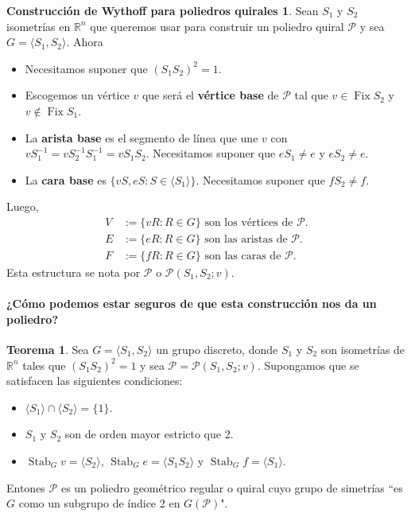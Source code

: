 \documentclass[spanish]{article}
\theoremstyle{definition}
\newtheorem*{teo}{Teorema}
\newtheorem*{Wqui}{Construcción de Wythoff para poliedros quirales}
\newcommand{\R}{\mathbb{R}}
\newcommand{\p}{\mathcal{P}}
\DeclareMathOperator{\Fix}{Fix}
\DeclareMathOperator{\Stab}{Stab}
\begin{document}
	\begin{Wqui}
		Sean $S_1$ y $S_2$ isometrías en $\R^n$ que queremos usar para construir un poliedro quiral $\p$  y sea $G=\langle S_1,S_2\rangle$. Ahora
		\begin{itemize}
			\item Necesitamos suponer que $(S_1S_2)^2=1$.
			\item Escogemos un vértice $v$ que será el \textbf{vértice base} de $\p$ tal que $v\in\Fix S_2$ y $v\notin\Fix S_1$.
			\item La \textbf{arista base} es el segmento de línea que une $v$ con $vS_1^{-1}=vS_2^{-1}S_1^{-1}=vS_1S_2$. Necesitamos suponer que $eS_1\neq e$ y $eS_2\neq e$.
			\item La \textbf{cara base} es $\{vS,eS:S\in\langle S_1\rangle\}$. Necesitamos suponer que $fS_2\neq f$.
		\end{itemize}
		Luego,
		\begin{align*}
			V&:=\{vR:R\in G\}\text{ son los vértices de } \p.\\ 
			E&:=\{eR:R\in G\} \text{ son las aristas de } \p.\\ 
			F&:=\{fR:R\in G\} \text{ son las caras de } \p.
		\end{align*}
		Esta estructura se nota por $\p$ o $\p(S_1,S_2;v)$.
	\end{Wqui}
	
	\paragraph{¿Cómo podemos estar seguros de que esta construcción nos da un poliedro?}
	\begin{teo}\label{teo:bris1}
		Sea $G=\langle S_1,S_2\rangle$ un grupo discreto, donde $S_1$ y $S_2$ son isometrías de $\R^n$ tales que $(S_1S_2)^2=1$ y sea $\p=\p(S_1,S_2;v)$. Supongamos que se satisfacen las siguientes condiciones:
		\begin{itemize}
			\item $\langle S_1\rangle\cap\langle S_2\rangle=\{1\}$.
			\item $S_1$ y $S_2$ son de orden mayor estricto que 2.
			\item $\Stab_G v=\langle S_2\rangle$, $\Stab_G e=\langle S_1S_2\rangle$ y $\Stab_G f=\langle S_1\rangle$.
		\end{itemize}
		Entones $\p$ es un poliedro geométrico regular o quiral cuyo grupo de simetrías ``es $G$ como un subgrupo de índice 2 en $G(\p)$".
	\end{teo}
	
\end{document}

